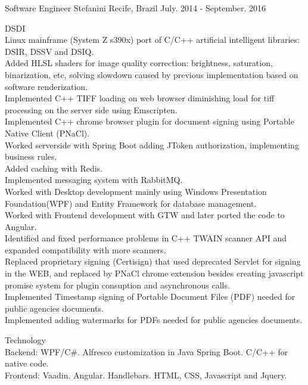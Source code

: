 \begin{cventries}
  \cventry
    {Software Engineer} %
    {Stefanini} %
    {Recife, Brazil} %
    {July. 2014 - September. 2016} %
    {
      \begin{cvitems} %
\item{DSDI\\
Linux mainframe (System Z s390x) port of C/C++ artificial intelligent libraries: DSIR, DSSV and DSIQ.\\
Added HLSL shaders for image quality correction: brightness, saturation, binarization, etc, solving slowdown caused by previous implementation based on software renderization.\\
Implemented C++ TIFF loading on web browser diminishing load for tiff processing on the server side using Emscripten.\\
Implemented C++ chrome browser plugin for document signing using Portable Native Client (PNaCl).\\
Worked serverside with Spring Boot adding JToken authorization, implementing business rules.\\
Added caching with Redis. \\
Implemented messaging system with RabbitMQ.\\
Worked with Desktop development mainly using Windows Presentation Foundation(WPF) and Entity Framework for database management.\\
Worked with Frontend development with GTW and later ported the code to Angular.\\
Identified and fixed performance problems in C++ TWAIN scanner API and expanded compatibility with more scanners.\\
Replaced proprietary signing (Certisign) that used deprecated Servlet for signing in the WEB, and replaced by PNaCl chrome extension besides creating javascript promise system for plugin consuption and asynchronous calls.\\
Implemented Timestamp signing of Portable Document Files (PDF) needed for public agencies documents.\\
Implemented adding watermarks for PDFs needed for public agencies documents.}
\item{Technology\\
Backend: WPF/C\#. Alfresco customization in Java Spring Boot. C/C++ for native code.\\
Frontend: Vaadin. Angular. Handlebars. HTML, CSS, Javascript and Jquery.}
      \end{cvitems}
    }


\end{cventries}
